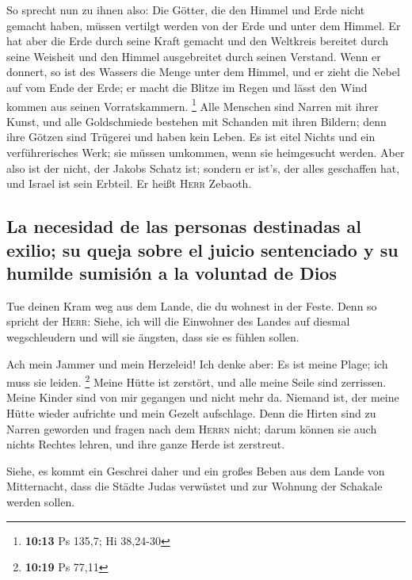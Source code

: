  So sprecht nun zu ihnen also: Die Götter, die den Himmel
und Erde nicht gemacht haben, müssen vertilgt werden von der Erde und
unter dem Himmel.  Er hat aber die Erde durch seine Kraft
gemacht und den Weltkreis bereitet durch seine Weisheit und den Himmel
ausgebreitet durch seinen Verstand.  Wenn er donnert, so
ist des Wassers die Menge unter dem Himmel, und er zieht die Nebel auf
vom Ende der Erde; er macht die Blitze im Regen und lässt den Wind
kommen aus seinen Vorratskammern. \footnote{\textbf{10:13} Ps 135,7; Hi
  38,24-30}  Alle Menschen sind Narren mit ihrer Kunst,
und alle Goldschmiede bestehen mit Schanden mit ihren Bildern; denn ihre
Götzen sind Trügerei und haben kein Leben.  Es ist eitel
Nichts und ein verführerisches Werk; sie müssen umkommen, wenn sie
heimgesucht werden.  Aber also ist der nicht, der Jakobs
Schatz ist; sondern er ist's, der alles geschaffen hat, und Israel ist
sein Erbteil. Er heißt \textsc{Herr} Zebaoth.

\hypertarget{la-necesidad-de-las-personas-destinadas-al-exilio-su-queja-sobre-el-juicio-sentenciado-y-su-humilde-sumisiuxf3n-a-la-voluntad-de-dios}{%
\subsection{La necesidad de las personas destinadas al exilio; su queja
sobre el juicio sentenciado y su humilde sumisión a la voluntad de
Dios}\label{la-necesidad-de-las-personas-destinadas-al-exilio-su-queja-sobre-el-juicio-sentenciado-y-su-humilde-sumisiuxf3n-a-la-voluntad-de-dios}}

 Tue deinen Kram weg aus dem Lande, die du wohnest in der
Feste.  Denn so spricht der \textsc{Herr}: Siehe, ich
will die Einwohner des Landes auf diesmal wegschleudern und will sie
ängsten, dass sie es fühlen sollen.

 Ach mein Jammer und mein Herzeleid! Ich denke aber: Es
ist meine Plage; ich muss sie leiden. \footnote{\textbf{10:19} Ps 77,11}
 Meine Hütte ist zerstört, und alle meine Seile sind
zerrissen. Meine Kinder sind von mir gegangen und nicht mehr da. Niemand
ist, der meine Hütte wieder aufrichte und mein Gezelt aufschlage.
 Denn die Hirten sind zu Narren geworden und fragen nach
dem \textsc{Herrn} nicht; darum können sie auch nichts Rechtes lehren,
und ihre ganze Herde ist zerstreut.

 Siehe, es kommt ein Geschrei daher und ein großes Beben
aus dem Lande von Mitternacht, dass die Städte Judas verwüstet und zur
Wohnung der Schakale werden sollen.

